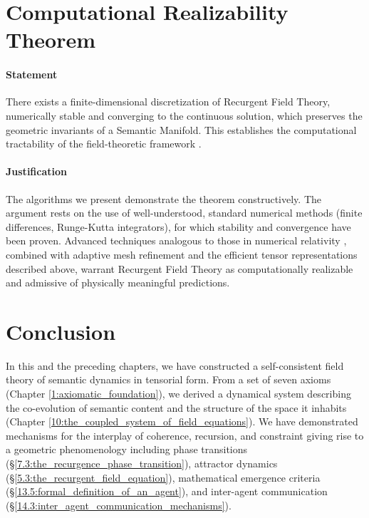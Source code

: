 
\section{Computational Realizability Theorem}
\label{17.6:computational_realizability_theorem}

\paragraph{Statement}

There exists a finite-dimensional discretization of Recurgent Field Theory, numerically stable and converging to the continuous solution, which preserves the geometric invariants of a Semantic Manifold. This establishes the computational tractability of the field-theoretic framework \autocite{KochConsciousness2019}.

\paragraph{Justification}
The algorithms we present demonstrate the theorem constructively. The argument rests on the use of well-understood, standard numerical methods (finite differences, Runge-Kutta integrators), for which stability and convergence have been proven. Advanced techniques analogous to those in numerical relativity \autocite{BaumgarteShapiro2010}, combined with adaptive mesh refinement and the efficient tensor representations described above, warrant Recurgent Field Theory as computationally realizable and admissive of physically meaningful predictions.


\section{Conclusion}
\label{17.7:conclusion}

In this and the preceding chapters, we have constructed a self-consistent field theory of semantic dynamics in tensorial form. From a set of seven axioms (Chapter \ref{1:axiomatic_foundation}), we derived a dynamical system describing the co-evolution of semantic content and the structure of the space it inhabits (Chapter \ref{10:the_coupled_system_of_field_equations}). We have demonstrated mechanisms for the interplay of coherence, recursion, and constraint giving rise to a geometric phenomenology including phase transitions (\S\ref{7.3:the_recurgence_phase_transition}), attractor dynamics (\S\ref{5.3:the_recurgent_field_equation}), mathematical emergence criteria (\S\ref{13.5:formal_definition_of_an_agent}), and inter-agent communication (\S\ref{14.3:inter_agent_communication_mechanisms}).

